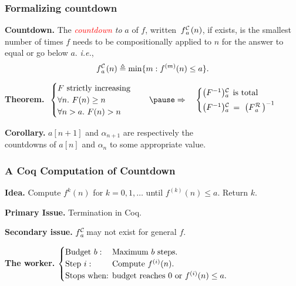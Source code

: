 \begin{frame}
\frametitle{Formalizing countdown}

\textbf{Countdown.} The \textit{\textcolor{red}{countdown} to} $a$ of $f$, written~$\cdt{f}{a}(n)$, if exists, is the smallest number of times $f$ needs to be compositionally applied to
$n$ for the answer to equal or go below $a$. \emph{i.e.},
\begin{equation*}
\cdt{f}{a}(n) \triangleq \min\{m: f^{(m)}(n)\le a \}.
\end{equation*}

\pause
\textbf{Theorem.}
$~\displaystyle
\begin{cases}
F \text{ strictly increasing} \\ \forall n.~F(n)\ge n \\
\forall n > a.~F(n) > n
\end{cases}
\quad \pause \implies \quad
\begin{cases}
\cdt{\left(F^{-1}\right)}{a} \text{ is total} \\[3pt]
\cdt{\left(F^{-1}\right)}{a}\ \ = \ \left(\rf{F}{a}\ \right)^{-1}
\end{cases}
$

\bigskip
\pause
\textbf{Corollary.} $a[n+1]$ and $\alpha_{n+1}$ are respectively the\\ countdowns of $a[n]$ and $\alpha_n$ to some appropriate value.

\end{frame}


\begin{frame}[fragile]
\frametitle{A Coq Computation of Countdown}
\textbf{Idea.} %
Compute $f^{k}(n)$ for $k=0, 1,\ldots$ until $f^{(k)}(n)\le a$. Return $k$.

\bigskip

\pause 
\textbf{Primary Issue.} Termination in Coq.

\bigskip

\textbf{Secondary issue.} $\cdt{f}{a}$ may not exist for general $f$.

\bigskip

\pause 
\textbf{The worker.} $\begin{cases}
\text{Budget } b: & \hspace{-1em}\text{Maximum } b \text{ steps. } \\
\text{Step } i: & \hspace{-1em}\text{Compute } f^{(i)}(n). \\
\text{Stops when: } & \hspace{-1em}\text{budget reaches } 0 \text{ or } f^{(i)}(n) \le a.
\end{cases}$
\end{frame}


